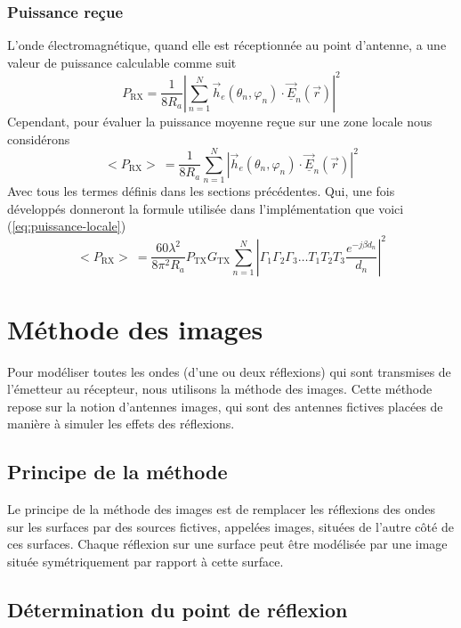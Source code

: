 \subsubsection*{Puissance reçue}
L'onde {\'e}lectromagn{\'e}tique, quand elle est r{\'e}ceptionn{\'e}e au point
d'antenne, a une valeur de puissance calculable
comme suit
\[ P_{\mathrm{RX}} = \frac{1}{8 R_a} \left| \sum_{n = 1}^N \vec{h}_e (\theta_n,
   \varphi_n) \cdot \overrightarrow{\underline{E}}_n (\vec{r}) \right|^2 \]
Cependant, pour {\'e}valuer la puissance moyenne re{\c c}ue sur une zone locale nous considérons 
\[ < P_{\mathrm{RX}} >\ = \frac{1}{8 R_a} \sum_{n = 1}^N \left| \vec{h}_e (\theta_n,
   \varphi_n) \cdot \overrightarrow{\underline{E}}_n (\vec{r}) \right|^2 \]
Avec tous les termes d{\'e}finis dans les sections pr{\'e}c{\'e}dentes. Qui, une fois développés donneront la formule utilisée dans l'implémentation que voici
(\ref{eq:puissance-locale})
\begin{equation}
\label{eq:puissance-locale}
    <P_{\mathrm{RX}}>\ = \frac{60 \lambda^2}{8 \pi^2 R_a}P_{\mathrm{TX}}G_{\mathrm{TX}}\sum_{n=1}^N \left| \Gamma_1 \Gamma_2 \Gamma_3 \dotsc T_1 T_2 T_3 \frac{e^{-j \beta d_n}}{d_n} \right|^2
\end{equation}
\section{M{\'e}thode des images}

Pour mod{\'e}liser toutes les ondes (d'une ou deux r{\'e}flexions) qui sont
transmises de l'émetteur au récepteur, nous utilisons la
m{\'e}thode des images. Cette m{\'e}thode repose sur la notion d'antennes
images, qui sont des antennes fictives plac{\'e}es de mani{\`e}re {\`a}
simuler les effets des r{\'e}flexions.

\subsection{Principe de la m{\'e}thode}

Le principe de la m{\'e}thode des images est de remplacer les r{\'e}flexions
des ondes sur les surfaces par des sources fictives, appel{\'e}es images,
situ{\'e}es de l'autre c{\^o}t{\'e} de ces surfaces. Chaque r{\'e}flexion sur
une surface peut {\^e}tre mod{\'e}lis{\'e}e par une image situ{\'e}e
sym{\'e}triquement par rapport {\`a} cette surface.

\subsection{D{\'e}termination du point de r{\'e}flexion}

